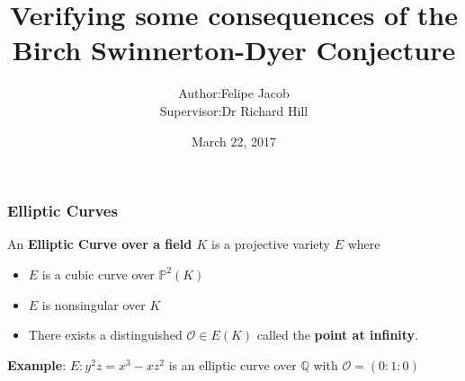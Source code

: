 \documentclass{beamer}
\begin{document}
\title[BSD]{Verifying some consequences of the \\ Birch Swinnerton-Dyer Conjecture}
\author[Felipe Jacob]{\begin{tabular}{r@{ }l}
                        Author: & Felipe Jacob \\
                        Supervisor: &Dr Richard Hill
                                      \end{tabular}}
\date{March 22, 2017}

\newcommand{\defin}{\textbf}
\newcommand{\CC}{{\mathbb C}}
\newcommand{\cov}{{\operatorname{cov}}}
\newcommand{\eE}{{\mathcal E}}
\newcommand{\NN}{{\mathbb N}}
\newcommand{\PP}{{\mathbb P}}
\newcommand{\ZZ}{{\mathbb Z}}
\renewcommand{\SS}{{\mathbb S}}
\newcommand{\DD}{{\mathbb D}}
\newcommand{\RR}{{\mathbb R}}
\newcommand{\QQ}{{\mathbb Q}}
\newcommand{\rR}{{\mathcal R}}
\newcommand{\OO}{{\mathcal O}}
\newcommand{\p}{\partial}
\newcommand{\mM}{{\mathcal M}}
\newcommand{\pP}{{\mathcal P}}
\newcommand{\iI}{{\mathcal I}}
\newcommand{\jJ}{{\mathcal J}}
\newcommand{\uU}{{\mathcal U}}
\newcommand{\sS}{{\mathfrak S}}
\newcommand{\1}{{\mathds 1}}
\newcommand{\Crit}{\operatorname{Crit}}
\newcommand{\GKK}{{G_{\bar{K} : K}}}
\newcommand{\st}{{\text{s.t.}}}
\newcommand{\ra}{\rightarrow}
\newcommand{\Sel}{\text{\normalfont Sel}}
\newcommand{\Sha}{\text{\normalfont Sha}}
\newcommand{\TS}{\text{\normalfont TS}}
\newcommand{\Eb}{\bar{E}}
\newcommand{\EQ}{E(\QQ)}
\newcommand{\cmark}{\textrm{\ding{51}}}
\newcommand{\xmark}{\textrm{\ding{55}}}
\newcommand{\EFp}{{\tilde{E}(\FF_p)}}
\newcommand{\EFt}{{\tilde{E}(\FF_2)}}
\newcommand{\EQp}{{E(\QQ_p)}}
\newcommand{\FF}{\mathbb{F}}
\newcommand{\HH}{\mathbb{H}}
\newcommand{\Tors}{{\text{\normalfont Tors}}}
\newcommand{\parder}[2]{\frac{\partial #1}{\partial #2}}
\newcommand{\Zpx}{\mathbb{Z}_p^\times}
\newcommand{\legendre}[2]{\left(\frac{#1}{#2}\right)}
\newcommand{\quadring}[1]{\ZZ[\sqrt{#1}]}
\newcommand{\Ip}{\mathfrak{p}}
\newcommand{\Aa}{\mathbb{A}}
\newcommand{\LL}{\mathcal{L}}
\newcommand{\Shim}{\textnormal{Shim}}

\frame{\titlepage}
 
\begin{frame}
\frametitle{Elliptic Curves}
An \textbf{Elliptic Curve over a field $K$} is a projective variety $E$
where
\begin{itemize}
\item $E$ is a cubic curve over $\PP^2(K)$
\item $E$ is nonsingular over $K$
\item There exists a distinguished $\OO \in E(K)$ called the \textbf{point at infinity}.
\end{itemize} \pause
\bigskip

\textbf{Example}: $E: y^2z = x^3 - xz^2$ is an elliptic curve over
$\QQ$ with $\OO = (0:1:0)$
\end{frame}
\end{document}
